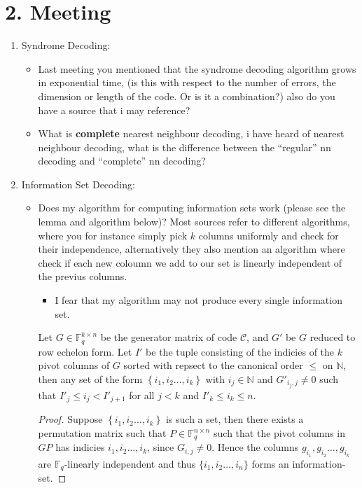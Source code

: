 \documentclass[11pt]{article}
\begin{document}
\section{2. Meeting}
\label{sec:orga561fc3}
\begin{enumerate}
\item Syndrome Decoding:
\begin{itemize}
\item Last meeting you mentioned that the syndrome decoding algorithm grows in exponential time, (is this with respect to the number of errors, the dimension or length of the code. Or is it a combination?) also do you have a source that i may reference?

\item What is \textbf{complete} nearest neighbour decoding, i have heard of nearest neighbour decoding, what is the difference between the ``regular'' nn decoding and ``complete'' nn decoding?
\end{itemize}

\item Information Set Decoding:
\begin{itemize}
\item Does my algorithm for computing information sets work (please see the lemma and algorithm below)? Most sources refer to different algorithms, where you for instance simply pick \(k\) columns uniformly and check for their independence, alternatively they also mention an algorithm where check if each new coloumn we add to our set is linearly independent of the previus columns.
\begin{itemize}
\item I fear that my algorithm may not produce every single information set.
\end{itemize}
\begin{lemma}\label{lem:new_information_sets}
  Let $G \in \mathbb{F}_q^{k \times n}$ be the generator matrix of code $\mathcal{C}$, and $G'$ be $G$ reduced to row echelon form. Let $I'$ be the tuple consisting of the indicies of the $k$ pivot columns of $G$ sorted with repsect to the canonical order $\leq$ on $\mathbb{N}$, then any set of the form $\left\{i_1, i_2 \ldots, i_{k}\right\}$ with $i_j \in \mathbb{N}$ and $G'_{i_j,j} \neq 0$ such that $I'_j \leq i_j < I'_{j + 1}$ for all $j < k$ and $I'_k \leq i_k \leq n$.
\end{lemma}
\begin{proof}
  Suppose $\left\{i_1, i_2 \ldots, i_{k}\right\}$ is such a set, then there exists a permutation matrix such that $P \in \mathbb{F}_q^{n \times n}$ such that the pivot columns in $GP$ has indicies $i_1, i_2 \ldots, i_{k}$, since $G_{i, j} \neq 0$. Hence the columns $g_{i_1}, g_{i_2} \ldots, g_{i_{k}}$ are $\mathbb{F}_q$-linearly independent and thus $\{i_1, i_2 \ldots, i_{n}\}$ forms an information-set.
\end{proof}


\end{itemize}
\end{enumerate}
\end{document}
